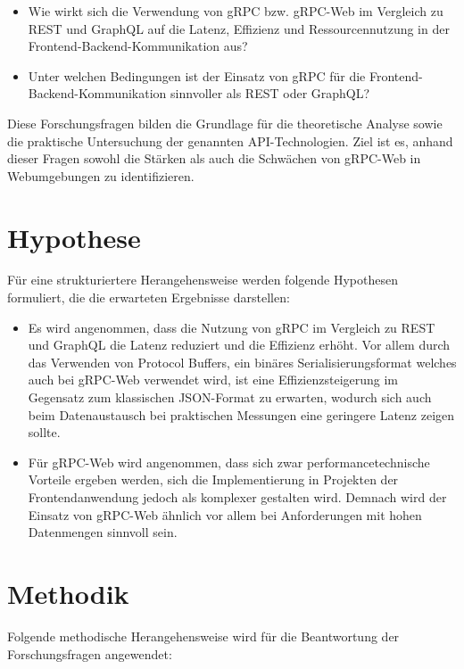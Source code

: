 \begin{itemize}
	\item Wie wirkt sich die Verwendung von gRPC bzw. gRPC-Web im Vergleich zu REST
	und GraphQL auf die Latenz, Effizienz und Ressourcennutzung in der Frontend-Backend-Kommunikation aus?
	
	\item Unter welchen Bedingungen ist der Einsatz von gRPC für die
	Frontend-Backend-Kommunikation sinnvoller als REST oder GraphQL?
	
\end{itemize}

Diese Forschungsfragen bilden die Grundlage für die theoretische Analyse sowie die
praktische Untersuchung der genannten API-Technologien. Ziel ist es, anhand dieser
Fragen sowohl die Stärken als auch die Schwächen von gRPC-Web in Webumgebungen
zu identifizieren.


\section{Hypothese}
Für eine strukturiertere Herangehensweise werden folgende Hypothesen formuliert, die
die erwarteten Ergebnisse darstellen:

\begin{itemize}
	\item Es wird angenommen, dass die Nutzung von gRPC im Vergleich zu REST und
	GraphQL die Latenz reduziert und die Effizienz erhöht. Vor allem durch das Verwenden
	von Protocol Buffers, ein binäres Serialisierungsformat welches auch
	bei gRPC-Web verwendet wird, ist eine Effizienzsteigerung im Gegensatz zum klassischen JSON-Format zu erwarten, wodurch sich auch beim Datenaustausch bei praktischen Messungen eine geringere Latenz zeigen sollte.
	
	\item Für gRPC-Web wird angenommen, dass sich zwar performancetechnische Vorteile
	ergeben werden, sich die Implementierung in Projekten der Frontendanwendung
	jedoch als komplexer gestalten wird. Demnach wird der Einsatz von gRPC-Web ähnlich vor allem bei Anforderungen mit hohen Datenmengen sinnvoll sein.

	
\end{itemize}

\section{Methodik}
Folgende methodische Herangehensweise wird für die Beantwortung der Forschungsfragen angewendet:

